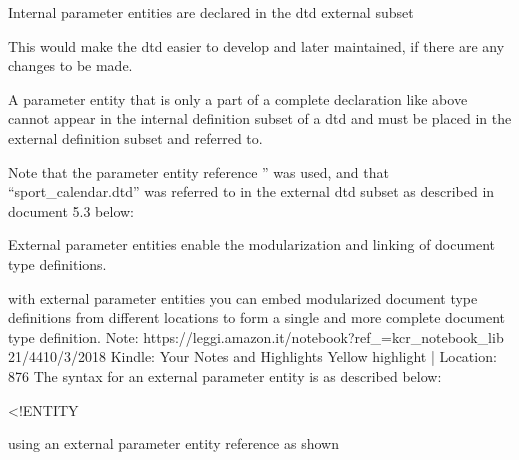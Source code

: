 Internal parameter entities are declared in the dtd external subset


This would make the dtd easier to develop and later maintained, if there are
any changes to be made.


A parameter entity that is only a part of a complete declaration like above
cannot appear in the internal definition subset of a dtd and must be placed in
the external definition subset and referred to.


Note that the parameter entity reference ”%
was used, and that “sport_calendar.dtd” was referred to in the external dtd
subset as described in document 5.3 below:


External parameter entities enable the modularization and linking of document
type definitions.


with external parameter entities you can embed modularized document type
definitions from different locations to form a single and more complete
document type definition.
Note:
https://leggi.amazon.it/notebook?ref_=kcr_notebook_lib
21/4410/3/2018
Kindle: Your Notes and Highlights
Yellow highlight | Location: 876
The syntax for an external parameter entity is as described below:


<!ENTITY %


using an external parameter entity reference as shown
